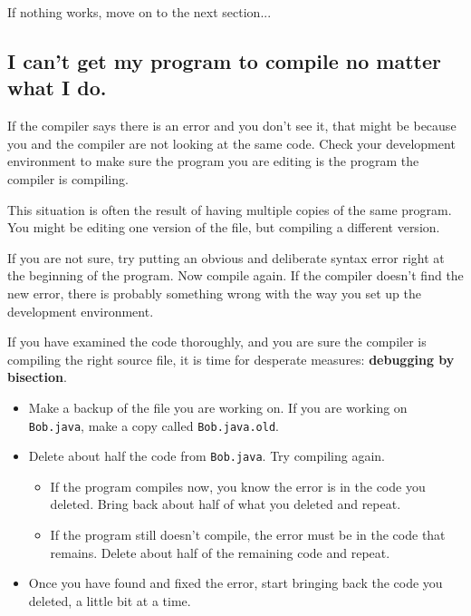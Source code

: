 \documentclass[12pt]{book}
\theoremstyle{exercise}
\begin{document}
If nothing works, move on to the next section...


\subsection*{I can't get my program to compile no matter what I do.}

If the compiler says there is an error and you don't see it, that might be because you and the compiler are not looking at the same code.
Check your development environment to make sure the program you are editing is the program the compiler is compiling.

This situation is often the result of having multiple copies of the same program.
You might be editing one version of the file, but compiling a different version.

If you are not sure, try putting an obvious and deliberate syntax error right at the beginning of the program.
Now compile again.
If the compiler doesn't find the new error, there is probably something wrong with the way you set up the development environment.


If you have examined the code thoroughly, and you are sure the compiler is compiling the right source file, it is time for desperate measures: {\bf debugging by bisection}.

\begin{itemize}

\item Make a backup of the file you are working on.
If you are working on {\tt Bob.java}, make a copy called {\tt Bob.java.old}.

\item Delete about half the code from {\tt Bob.java}.
Try compiling again.

\begin{itemize}

\item If the program compiles now, you know the error is in the code you deleted.
Bring back about half of what you deleted and repeat.

\item If the program still doesn't compile, the error must be in the code that remains.
Delete about half of the remaining code and repeat.

\end{itemize}

\item Once you have found and fixed the error, start bringing back the code you deleted, a little bit at a time.

\end{itemize}
\end{document}
